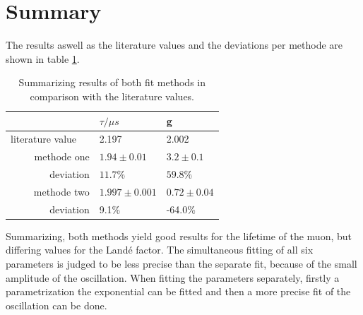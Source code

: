 \documentclass{include/thesisclass3}
\begin{document}
\section{Summary}
The results aswell as the literature values and the deviations per methode are shown in table \ref{tablö}.\\

\begin{table}[H]
\caption{\label{tablö}Summarizing results of both fit methods in comparison with the literature values.}
\begin{center}
\begin{tabular}{r|ll}
 & $\tau /\mu s$ & g \\ 
\toprule
literature value $\quad$& 2.197 & 2.002 \\ 
\midrule
methode one & $1.94 \pm 0.01$ & $3.2\pm 0.1$ \\ 
deviation & $11.7$\% & $59.8$\% \\ 
\midrule 
methode two & $1.997 \pm 0.001$ & $ 0.72 \pm 0.04$ \\  
deviation & 9.1\% & -64.0\%  
\label{tablö}
\end{tabular} 
\end{center}
\end{table}

Summarizing, both methods yield good results for the lifetime of the muon, but differing values for the Landé factor. 
The simultaneous fitting of all six parameters is judged to be less precise than the separate fit, because of the small amplitude of the oscillation.
When fitting the parameters separately, firstly a parametrization the exponential can be fitted and then a more precise fit of the oscillation can be done.  
\end{document}
